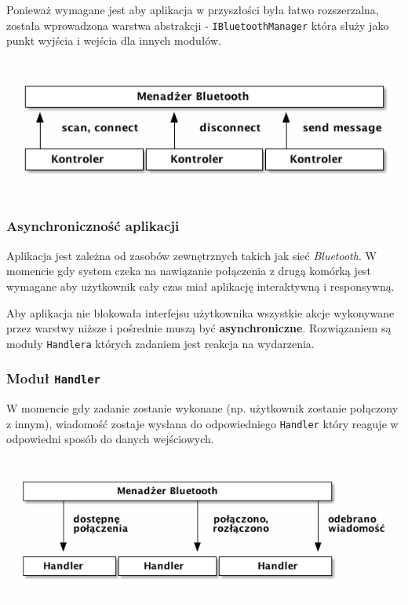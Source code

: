 \documentclass[a4paper, titlepage]{article}
\begin{document}
Ponieważ wymagane jest aby aplikacja w przyszłości była łatwo rozszerzalna, została wprowadzona warstwa abstrakcji - \texttt{IBluetoothManager} która służy jako punkt wyjścia i wejścia dla innych modułów.

\begin{center}
\includegraphics[width=.9\linewidth]{BM.png}
\end{center}

\subsubsection{Asynchroniczność aplikacji}
\label{sec:org43b797d}
Aplikacja jest zależna od zasobów zewnętrznych takich jak sieć \emph{Bluetooth}. W momencie gdy system czeka na nawiązanie połączenia z drugą komórką jest wymagane aby użytkownik cały czas miał aplikację interaktywną i responsywną. 

Aby aplikacja nie blokowała interfejsu użytkownika wszystkie akcje wykonywane przez warstwy niższe i pośrednie muszą być \textbf{asynchroniczne}.
Rozwiązaniem są moduły \texttt{Handlera} których zadaniem jest reakcja na wydarzenia.
\subsubsection{Moduł \texttt{Handler}}
\label{sec:orgc7b1413}
W momencie gdy zadanie zostanie wykonane (np. użytkownik zostanie połączony z innym), wiadomość zostaje wysłana do odpowiedniego \texttt{Handler} który reaguje w odpowiedni sposób do danych wejściowych.

\begin{center}
\includegraphics[width=.9\linewidth]{Handler.png}
\end{center}
\end{document}
